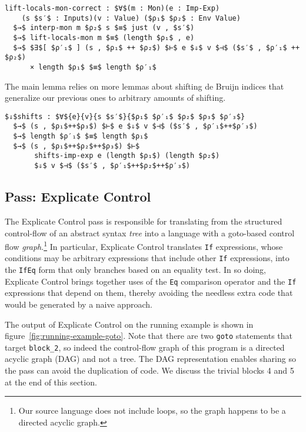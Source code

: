 \documentclass[sigplan,review,dvipsnames,screen,10pt]{acmart}
\begin{document}
\begin{lstlisting}
lift-locals-mon-correct : $∀$(m : Mon)(e : Imp-Exp)
    (s $s′$ : Inputs)(v : Value) ($ρ₁$ $ρ₂$ : Env Value)
  $→$ interp-mon m $ρ₂$ s $≡$ just (v , $s′$)
  $→$ lift-locals-mon m $≡$ (length $ρ₁$ , e)
  $→$ $∃$[ $ρ′₁$ ] (s , $ρ₁$ ++ $ρ₂$) $⊢$ e $⇓$ v $⊣$ ($s′$ , $ρ′₁$ ++ $ρ₂$)
      × length $ρ₁$ $≡$ length $ρ′₁$
\end{lstlisting}

The main lemma relies on more lemmas about shifting de Bruijn indices
that generalize our previous ones to arbitrary amounts of shifting.

\begin{lstlisting}
$⇓$shifts : $∀${e}{v}{s $s′$}{$ρ₁$ $ρ′₁$ $ρ₂$ $ρ₃$ $ρ′₃$} 
  $→$ (s , $ρ₁$++$ρ₃$) $⊢$ e $⇓$ v $⊣$ ($s′$ , $ρ′₁$++$ρ′₃$)
  $→$ length $ρ′₁$ $≡$ length $ρ₁$
  $→$ (s , $ρ₁$++$ρ₂$++$ρ₃$) $⊢$
       shifts-imp-exp e (length $ρ₁$) (length $ρ₂$)
       $⇓$ v $⊣$ ($s′$ , $ρ′₁$++$ρ₂$++$ρ′₃$)
\end{lstlisting}


\subsection{Pass: Explicate Control}

The Explicate Control pass is responsible for translating from the
structured control-flow of an abstract syntax \emph{tree} into a
language with a goto-based control flow \emph{graph}.\footnote{Our
source language does not include loops, so the graph happens to be a
directed acyclic graph.} In particular, Explicate Control translates
\lstinline{If} expressions, whose conditions may be arbitrary
expressions that include other \lstinline{If} expressions, into the
\lstinline{IfEq} form that only branches based on an equality test. In
so doing, Explicate Control brings together uses of the \lstinline{Eq}
comparison operator and the \lstinline{If} expressions that depend on
them, thereby avoiding the needless extra code that would be generated
by a naive approach.

The output of Explicate Control on the running example is shown in
figure~\ref{fig:running-example-goto}. Note that there are two
\lstinline{goto} statements that target \lstinline{block_2}, so indeed
the control-flow graph of this program is a directed acyclic graph
(DAG) and not a tree. The DAG representation enables sharing so the
pass can avoid the duplication of code. We discuss the trivial blocks
4 and 5 at the end of this section.
\end{document}
